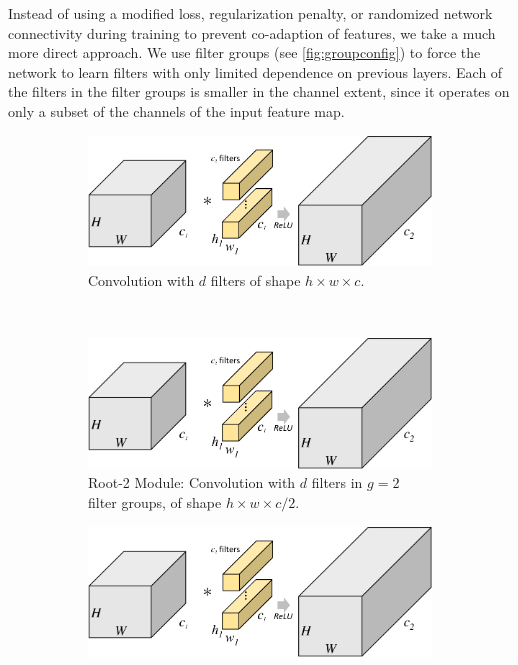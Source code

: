 \documentclass[thesis]{subfiles}
\begin{document}
	Instead of using a modified loss, regularization penalty, or randomized network connectivity during training to prevent co-adaption of features, we take a much more direct approach. We use filter groups (see \cref{fig:groupconfig}) to force the network to learn filters with only limited dependence on previous layers. Each of the filters in the filter groups is smaller in the channel extent, since it operates on only a subset of the channels of the input feature map. 
	
	\begin{figure}[tbp]
		\centering
		\begin{subfigure}[b]{0.95\textwidth}
			\centering
			\includegraphics[width=\textwidth, page=4]{Figs/PDF/groupfig}
			\caption{Convolution with $d$ filters of shape $h\times w\times c$.}
			\label{fig:normalresnet}
		\end{subfigure}\\
		\begin{subfigure}[b]{0.95\textwidth}
			\includegraphics[width=\textwidth, page=5]{Figs/PDF/groupfig}
			\caption{Root-2 Module: Convolution with $d$ filters in $g = 2$ filter groups, of shape $h\times w\times c/2$.}
			\label{fig:rootresnet2}
		\end{subfigure}
		\begin{subfigure}[b]{0.95\textwidth}
			\includegraphics[width=\textwidth, page=6]{Figs/PDF/groupfig}

\end{subfigure}
\end{figure}
\end{document}
